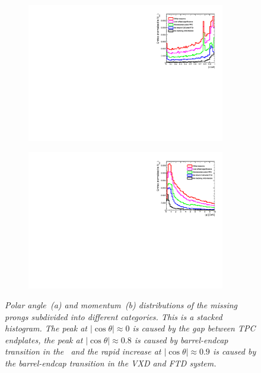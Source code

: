 \begin{figure}
\centering
\begin{subfigure}{0.5\textwidth}
    \includegraphics[width=0.95\textwidth]{ILD/plots/missed-tracks.pdf}
\caption{\label{fig:MissingTracks_cos_3} }
\end{subfigure}%
  \begin{subfigure}{0.5\textwidth}
\centering
    \includegraphics[width=0.95\textwidth]{ILD/plots/missed-momentum.pdf}
\caption{\label{fig:MissingTracks_p_3} }
\end{subfigure}
    \caption{\sl Polar angle~(a) and momentum~(b) distributions of the missing prongs subdivided into different categories. This is a stacked histogram. The peak at $|\cos\theta| \approx 0 $ is caused by the gap between TPC endplates, the peak at  $|\cos\theta| \approx 0.8$ is caused by barrel-endcap transition in the \ecal\ and the rapid increase at $|\cos\theta| \approx 0.9$ is caused by the barrel-endcap transition in the VXD and FTD system. }
    \label{fig:MissingTracks_3}
\end{figure}


